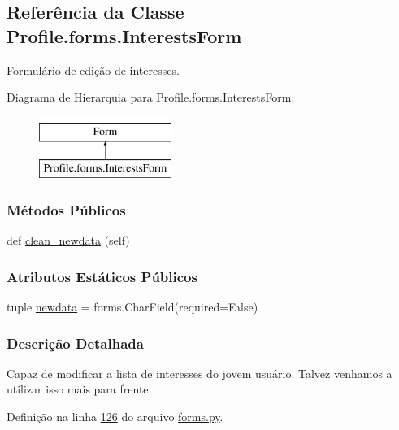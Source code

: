 \hypertarget{classProfile_1_1forms_1_1InterestsForm}{}\subsection{Referência da Classe Profile.\+forms.\+Interests\+Form}
\label{classProfile_1_1forms_1_1InterestsForm}


Formulário de edição de interesses.  


Diagrama de Hierarquia para Profile.\+forms.\+Interests\+Form\+:\begin{figure}[H]
\begin{center}
\leavevmode
\includegraphics[height=2.000000cm]{d4/d5e/classProfile_1_1forms_1_1InterestsForm}
\end{center}
\end{figure}
\subsubsection*{Métodos Públicos}
\begin{DoxyCompactItemize}
\item 
def \hyperlink{classProfile_1_1forms_1_1InterestsForm_a8938f38e00f554ec578ce7c39431ed08}{clean\+\_\+newdata} (self)
\end{DoxyCompactItemize}
\subsubsection*{Atributos Estáticos Públicos}
\begin{DoxyCompactItemize}
\item 
tuple \hyperlink{classProfile_1_1forms_1_1InterestsForm_ad400f3a7b43e71bd7772fa85e2961ff0}{newdata} = forms.\+Char\+Field(required=False)
\end{DoxyCompactItemize}


\subsubsection{Descrição Detalhada}
Capaz de modificar a lista de interesses do jovem usuário. Talvez venhamos a utilizar isso mais para frente. 

Definição na linha \hyperlink{Profile_2forms_8py_source_l00126}{126} do arquivo \hyperlink{Profile_2forms_8py_source}{forms.\+py}.



